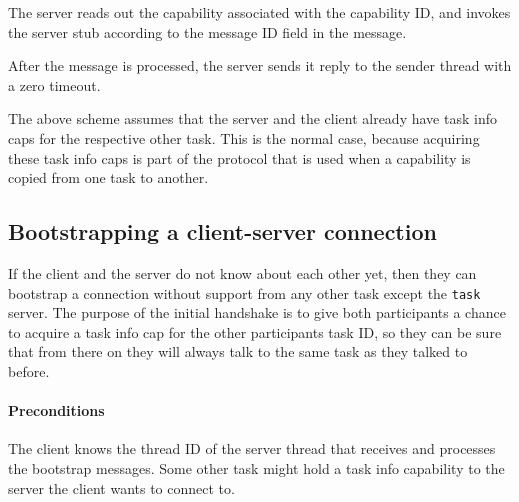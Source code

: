 The server reads out the capability associated with the capability ID,
and invokes the server stub according to the message ID field in the
message.

After the message is processed, the server sends it reply to the
sender thread with a zero timeout.

\begin{comment}
  Servers must never block on sending messages to clients.  Even a
  small timeout can be used for DoS-attacks.  The client can always
  make sure that it receives the reply by using a combined send and
  receive operation together with an infinite timeout.
\end{comment}

The above scheme assumes that the server and the client already have
task info caps for the respective other task.  This is the normal
case, because acquiring these task info caps is part of the protocol
that is used when a capability is copied from one task to another.


\subsection{Bootstrapping a client-server connection}
\label{ipcbootstrap}

If the client and the server do not know about each other yet, then
they can bootstrap a connection without support from any other task
except the \texttt{task} server.  The purpose of the initial handshake
is to give both participants a chance to acquire a task info cap for
the other participants task ID, so they can be sure that from there on
they will always talk to the same task as they talked to before.

\paragraph{Preconditions}
The client knows the thread ID of the server thread that receives and
processes the bootstrap messages.  Some other task might hold a task
info capability to the server the client wants to connect to.

\begin{comment}
  If no such other tasks exists, the protocol will still work.
  However, the client might not get a connection to the server that
  run at the time the client started the protocol, but rather to the
  server that run at the time the client acquired the task info cap
  for the server's task ID (after step 1 below).
 
  This is similar to how sending signals works in Unix: Technically,
  at the time you write \texttt{kill 203}, and press enter, you do not
  know if the process with the PID 203 you thought of will receive the
  signal, or some other process that got the PID in the time between
  you getting the information about the PID and writing the
  \texttt{kill}-command.
\end{comment}

